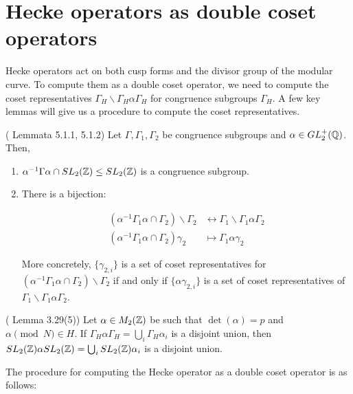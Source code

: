 \section{Hecke operators as double coset operators}

Hecke operators act on both cusp forms and the divisor group of the modular curve. To compute them as a double coset operator, we need to compute the coset representatives $\Gamma_H \backslash \Gamma_H \alpha \Gamma_H$ for congruence subgroups $\Gamma_H$. A few key lemmas will give us a procedure to compute the coset representatives.

\begin{lemma}{(\cite{Shurman} Lemmata 5.1.1, 5.1.2)}\label{lemma:coset_rep}
Let $\Gamma, \Gamma_1, \Gamma_2$ be congruence subgroups and  $\alpha \in GL_2^+(\mathbb{Q})$. Then,

\begin{enumerate}
    \item $\alpha^{-1} \Gamma \alpha \cap SL_2(\mathbb{Z}) \leq SL_2(\mathbb{Z})$ is a congruence subgroup.
    \item There is a bijection:

    \begin{align*}
        (\alpha^{-1} \Gamma_1 \alpha \cap \Gamma_2 )\backslash \Gamma_2 &\leftrightarrow \Gamma_1 \backslash \Gamma_1 \alpha \Gamma_2 \\
         (\alpha^{-1} \Gamma_1 \alpha \cap \Gamma_2 )\gamma_2 &\mapsto \Gamma_1 \alpha \gamma_2
    \end{align*}

    More concretely, $\{\gamma_{2,i}\}$ is a set of coset representatives for $(\alpha^{-1} \Gamma_1 \alpha \cap \Gamma_2 )\backslash \Gamma_2$ if and only if $\{\alpha \gamma_{2,i}\}$ is a set of coset representatives of $\Gamma_1 \backslash \Gamma_1 \alpha \Gamma_2$.
\end{enumerate}
\end{lemma}

\begin{lemma}{(\cite{shimura} Lemma 3.29(5))} \label{lemma:shimura_coset}
Let $\alpha \in M_2(\mathbb{Z})$ be such that $\det(\alpha) = p$ and $\alpha \pmod{N} \in H$. If $\Gamma_H \alpha \Gamma_H = \bigcup_i \Gamma_H \alpha_i$ is a disjoint union, then $SL_2(\mathbb{Z}) \alpha SL_2(\mathbb{Z}) = \bigcup_i SL_2(\mathbb{Z})\alpha_i$ is a disjoint union.
\end{lemma}

The procedure for computing the Hecke operator as a double coset operator is as follows:

